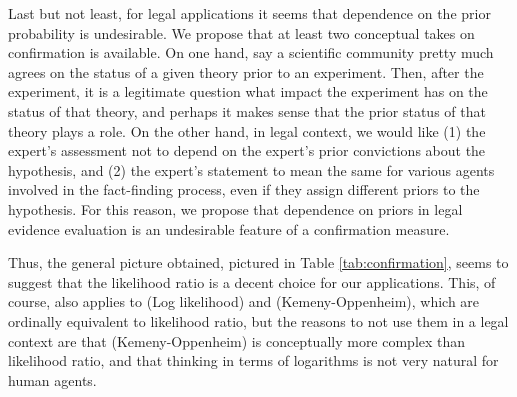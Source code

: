 \documentclass[10pt,dvipsnames,enabledeprecatedfontcommands]{scrartcl}
\begin{document}
Last but not least, for legal applications it seems that dependence on
the prior probability is undesirable. We propose that at least two
conceptual takes on confirmation is available. On one hand, say a
scientific community pretty much agrees on the status of a given theory
prior to an experiment. Then, after the experiment, it is a legitimate
question what impact the experiment has on the status of that theory,
and perhaps it makes sense that the prior status of that theory plays a
role. On the other hand, in legal context, we would like (1) the
expert's assessment not to depend on the expert's prior convictions
about the hypothesis, and (2) the expert's statement to mean the same
for various agents involved in the fact-finding process, even if they
assign different priors to the hypothesis. For this reason, we propose
that dependence on priors in legal evidence evaluation is an undesirable
feature of a confirmation measure.

Thus, the general picture obtained, pictured in Table
\ref{tab:confirmation}, seems to suggest that the likelihood ratio is a
decent choice for our applications. This, of course, also applies to
(Log likelihood) and (Kemeny-Oppenheim), which are ordinally equivalent
to likelihood ratio, but the reasons to not use them in a legal context
are that (Kemeny-Oppenheim) is conceptually more complex than likelihood
ratio, and that thinking in terms of logarithms is not very natural for
human agents.
\end{document}
